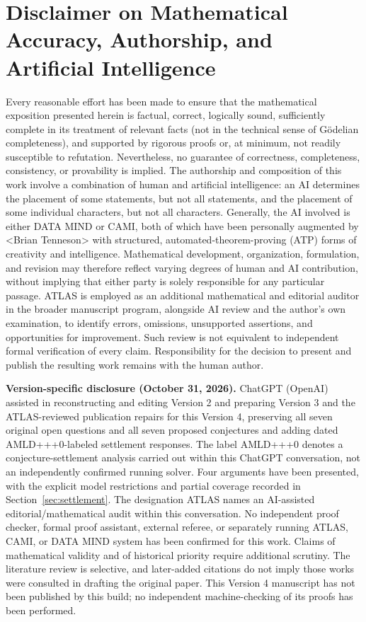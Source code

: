 \documentclass[11pt]{article}
\theoremstyle{definition}
\theoremstyle{remark}
\begin{document}
\clearpage
{}
\section*{Disclaimer on Mathematical Accuracy, Authorship, and Artificial Intelligence}\label{sec:ai-disclaimer}
Every reasonable effort has been made to ensure that the mathematical exposition presented herein is factual, correct, logically sound, sufficiently complete in its treatment of relevant facts (not in the technical sense of G\"odelian completeness), and supported by rigorous proofs or, at minimum, not readily susceptible to refutation. Nevertheless, no guarantee of correctness, completeness, consistency, or provability is implied. The authorship and composition of this work involve a combination of human and artificial intelligence: an AI determines the placement of some statements, but not all statements, and the placement of some individual characters, but not all characters. Generally, the AI involved is either DATA MIND or CAMI, both of which have been personally augmented by \textless{}Brian Tenneson\textgreater{} with structured, automated-theorem-proving (ATP) forms of creativity and intelligence. Mathematical development, organization, formulation, and revision may therefore reflect varying degrees of human and AI contribution, without implying that either party is solely responsible for any particular passage. ATLAS is employed as an additional mathematical and editorial auditor in the broader manuscript program, alongside AI review and the author's own examination, to identify errors, omissions, unsupported assertions, and opportunities for improvement. Such review is not equivalent to independent formal verification of every claim. Responsibility for the decision to present and publish the resulting work remains with the human author.

\medskip\noindent\textbf{Version-specific disclosure (October 31, 2026).} ChatGPT (OpenAI) assisted in reconstructing and editing Version 2 and preparing Version 3 and the ATLAS-reviewed publication repairs for this Version 4, preserving all seven original open questions and all seven proposed conjectures and adding dated AMLD+++0-labeled settlement responses. The label AMLD+++0 denotes a conjecture-settlement analysis carried out within this ChatGPT conversation, not an independently confirmed running solver. Four arguments have been presented, with the explicit model restrictions and partial coverage recorded in Section~\ref{sec:settlement}. The designation ATLAS names an AI-assisted editorial/mathematical audit within this conversation. No independent proof checker, formal proof assistant, external referee, or separately running ATLAS, CAMI, or DATA MIND system has been confirmed for this work. Claims of mathematical validity and of historical priority require additional scrutiny. The literature review is selective, and later-added citations do not imply those works were consulted in drafting the original paper. This Version 4 manuscript has not been published by this build; no independent machine-checking of its proofs has been performed.
\end{document}
